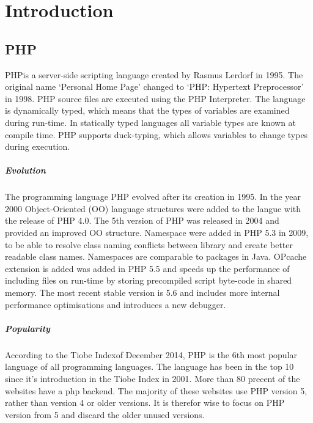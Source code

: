 \documentclass[../main.tex]{subfiles}
\begin{document}
    \chapter{Introduction}\label{chap:introduction}

    \section{PHP} %
        PHP\footnotemark is a server-side scripting language created by Rasmus Lerdorf in 1995.
        The original name `Personal Home Page' changed to `PHP: Hypertext Preprocessor' in 1998.
        PHP source files are executed using the PHP Interpreter. 
        The language is dynamically typed, which means that the types of variables are examined during run-time.
        In statically typed languages all variable types are known at compile time.
        PHP supports duck-typing, which allows variables to change types during execution.
        
        \paragraph{Evolution}
        The programming language PHP evolved after its creation in 1995.
        In the year 2000 Object-Oriented (OO) language structures were added to the langue with the release of PHP 4.0.
        The 5th version of PHP was released in 2004 and provided an improved OO structure.
        Namespace were added in PHP 5.3 in 2009, to be able to resolve class naming conflicts between library and create better readable class names.
        Namespaces are comparable to packages in Java.
        OPcache extension is added was added in PHP 5.5 and speeds up the performance of including files on run-time by storing precompiled script byte-code in shared memory.
        The most recent stable version is 5.6 and includes more internal performance optimisations and introduces a new debugger.
       
        \paragraph{Popularity}
        According to the Tiobe Index\footnotemark of December 2014, PHP is the 6th most popular language of all programming languages.
        The language has been in the top 10 since it's introduction in the Tiobe Index in 2001.
        More than 80 precent of the websites have a php backend\footnotemark.
        The majority of these websites use PHP version 5, rather than version 4 or older versions.
        It is therefor wise to focus on PHP version from 5 and discard the older unused versions.
            
\end{document}
